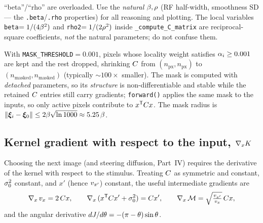 
\begin{remark}
``beta''/``rho'' are overloaded. Use the \emph{natural} $\beta,\rho$ (RF half-width,
smoothness SD --- the \texttt{.beta}/\texttt{.rho} properties) for all reasoning and
plotting. The local variables \texttt{beta}$=1/(4\beta^2)$ and
\texttt{rho2}$=1/(2\rho^2)$ inside \texttt{\_compute\_C\_matrix} are
reciprocal-square coefficients, \emph{not} the natural parameters; do not confuse
them.
\end{remark}

\begin{remark}
With \texttt{MASK\_THRESHOLD}$=0.001$, pixels whose locality weight satisfies
$\alpha_i\ge0.001$ are kept and the rest dropped, shrinking $C$ from
$(n_{\mathrm{px}},n_{\mathrm{px}})$ to $(n_{\mathrm{masked}},n_{\mathrm{masked}})$
(typically $\sim100\times$ smaller). The mask is computed with \emph{detached}
parameters, so its \emph{structure} is non-differentiable and stable while the
retained $C$ entries still carry gradients; \texttt{forward()} applies the same
mask to the inputs, so only active pixels contribute to $x^{\mathsf{T}}C x$. The
mask radius is $\lVert\bm{\xi}_i-\bm{\xi}_{0}\rVert\le2\beta\sqrt{\ln1000}\approx5.25\,\beta$.
\end{remark}

\subsection{Kernel gradient with respect to the input, $\nabla_xK$}
\label{subsec:gradxK}

Choosing the next image (and steering diffusion, Part~IV) requires the derivative
of the kernel with respect to the stimulus. Treating $C$ as symmetric and
constant, $\sigma_{0}^2$ constant, and $x'$ (hence $v_{x'}$) constant, the useful
intermediate gradients are
\begin{equation}
\nabla_x\,v_x=2\,C x,
\qquad
\nabla_x\,(x^{\mathsf{T}}C x'+\sigma_{0}^2)=C x',
\qquad
\nabla_x\,\mathcal{M}=\sqrt{\tfrac{v_{x'}}{v_x}}\,C x,
\end{equation}
and the angular derivative $dJ/d\theta=-(\pi-\theta)\sin\theta$.

